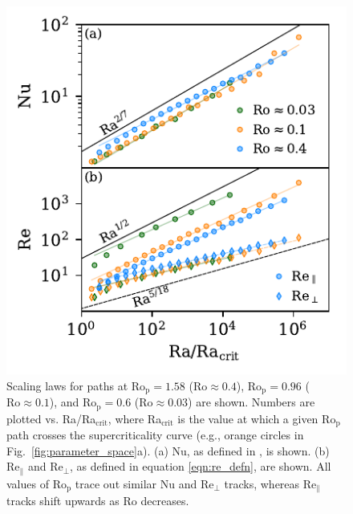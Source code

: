 \documentclass[twocolumn, amsmath, amsfonts, amssymb, trackchanges]{aastex62}
\newcommand{\pro}{\ensuremath{\text{Ro}_{\text{p}}}}
\begin{document}
\begin{figure}[t!]
    \includegraphics{nu_and_re.pdf}
    \caption{
	Scaling laws for paths at $\pro = 1.58$ ($\text{Ro} \approx 0.4$),
    $\pro = 0.96$ ($\text{Ro} \approx 0.1$), and $\pro = 0.6$ ($\text{Ro} \approx 0.03$) are shown. 
    Numbers are plotted vs. Ra/Ra$_{\text{crit}}$, where Ra$_{\text{crit}}$ is the value at which
	a given $\pro$ path crosses the supercriticality curve (e.g., orange circles in Fig.~\ref{fig:parameter_space}a).
	(a) Nu, as defined in \AB, is shown.
    (b) $\text{Re}_\parallel$ and $\text{Re}_{\perp}$, as defined in equation \ref{eqn:re_defn},
	are shown. All values of $\pro$ trace out similar Nu and $\text{Re}_{\perp}$ tracks,
	whereas $\text{Re}_\parallel$ tracks shift upwards as Ro decreases.
    \label{fig:nu_and_re} }
\end{figure}
\end{document}

